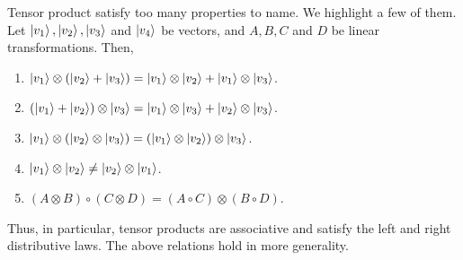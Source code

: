 Tensor product satisfy too many properties to name.  We highlight a few of them. 
Let $\ket{v_1}, \ket{v_2}, \ket{v_3}$ and $\ket{v_4}$ be vectors, and $A, B, C$ and $D$ be linear transformations.  Then,
\begin{enumerate}
    \item $\ket{v_1} \otimes (\ket{v_2}+\ket{v_3})=\ket{v_1} \otimes \ket{v_2} + \ket{v_1} \otimes \ket{v_3}$.
    \item $(\ket{v_1} + \ket{v_2})\otimes \ket{v_3}=\ket{v_1} \otimes \ket{v_3} + \ket{v_2} \otimes \ket{v_3}$.
    \item $\ket{v_1} \otimes (\ket{v_2} \otimes \ket{v_3})=(\ket{v_1} \otimes \ket{v_2}) \otimes \ket{v_3}$.
    \item $\ket{v_1} \otimes \ket{v_2} \ne \ket{v_2} \otimes \ket{v_1}$.
    \item $(A \otimes B)\circ(C \otimes D)=(A \circ C) \otimes (B \circ D)$.
\end{enumerate}

Thus, in particular, tensor products are associative and satisfy the left and right distributive laws.  The above relations hold in more generality.   

